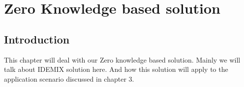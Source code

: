 \chapter{Zero Knowledge based solution}
\section{Introduction}
This chapter will deal with our Zero knowledge based solution. Mainly we will talk about IDEMIX solution here. And how this solution will apply to the application scenario discussed in chapter 3.